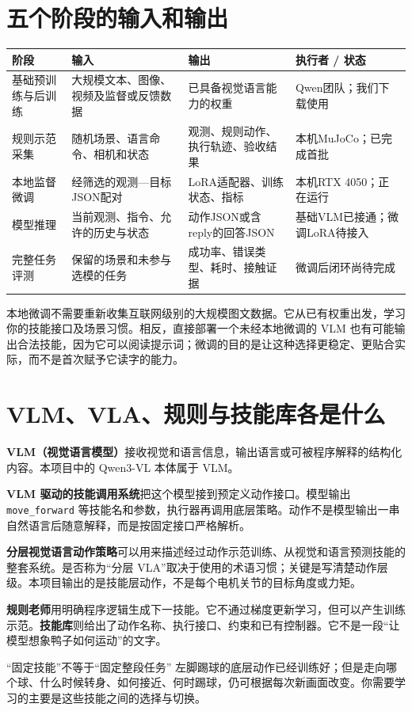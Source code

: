 \section{五个阶段的输入和输出}
\begin{longtable}{P{24mm}P{43mm}P{43mm}P{36mm}}
\toprule
阶段 & 输入 & 输出 & 执行者 / 状态\\
\midrule
\endhead
基础预训练与后训练 & 大规模文本、图像、视频及监督或反馈数据 & 已具备视觉语言能力的权重 & Qwen团队；我们下载使用\\
规则示范采集 & 随机场景、语言命令、相机和状态 & 观测、规则动作、执行轨迹、验收结果 & 本机MuJoCo；已完成首批\\
本地监督微调 & 经筛选的观测—目标JSON配对 & LoRA适配器、训练状态、指标 & 本机RTX 4050；正在运行\\
模型推理 & 当前观测、指令、允许的历史与状态 & 动作JSON或含reply的回答JSON & 基础VLM已接通；微调LoRA待接入\\
完整任务评测 & 保留的场景和未参与选模的任务 & 成功率、错误类型、耗时、接触证据 & 微调后闭环尚待完成\\
\bottomrule
\end{longtable}

本地微调不需要重新收集互联网级别的大规模图文数据。它从已有权重出发，学习你的技能接口及场景习惯。相反，直接部署一个未经本地微调的 VLM 也有可能输出合法技能，因为它可以阅读提示词；微调的目的是让这种选择更稳定、更贴合实际，而不是首次赋予它读字的能力。

\section{VLM、VLA、规则与技能库各是什么}
\textbf{VLM（视觉语言模型）}接收视觉和语言信息，输出语言或可被程序解释的结构化内容。本项目中的 Qwen3-VL 本体属于 VLM。

\textbf{VLM 驱动的技能调用系统}把这个模型接到预定义动作接口。模型输出 \texttt{move\_forward} 等技能名和参数，执行器再调用底层策略。动作不是模型输出一串自然语言后随意解释，而是按固定接口严格解析。

\textbf{分层视觉语言动作策略}可以用来描述经过动作示范训练、从视觉和语言预测技能的整套系统。是否称为“分层 VLA”取决于使用的术语习惯；关键是写清楚动作层级。本项目输出的是技能层动作，不是每个电机关节的目标角度或力矩。

\textbf{规则老师}用明确程序逻辑生成下一技能。它不通过梯度更新学习，但可以产生训练示范。\textbf{技能库}则给出了动作名称、执行接口、约束和已有控制器。它不是一段“让模型想象鸭子如何运动”的文字。

\begin{notebox}{“固定技能”不等于“固定整段任务”}
左脚踢球的底层动作已经训练好；但是走向哪个球、什么时候转身、如何接近、何时踢球，仍可根据每次新画面改变。你需要学习的主要是这些技能之间的选择与切换。
\end{notebox}

